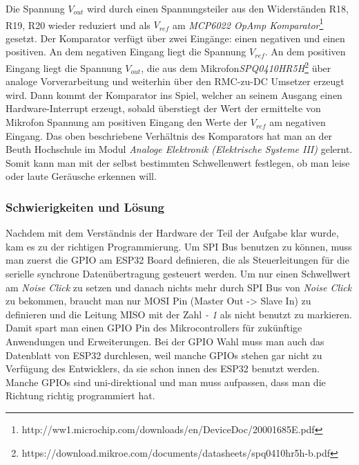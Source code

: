 Die Spannung $V_{out}$ wird durch einen Spannungsteiler aus den Widerständen R18, R19, R20 wieder reduziert und als $V_{ref}$ am \textit{MCP6022 OpAmp Komparator}\footnote{http://ww1.microchip.com/downloads/en/DeviceDoc/20001685E.pdf} gesetzt. Der Komparator verfügt über zwei Eingänge: einen negativen und einen positiven. An dem negativen Eingang liegt die Spannung $V_{ref}$. An dem positiven Eingang liegt die Spannung $V_{out}$, die aus dem Mikrofon\textit{SPQ0410HR5H}\footnote{https://download.mikroe.com/documents/datasheets/spq0410hr5h-b.pdf} über analoge Vorverarbeitung und weiterhin über den RMC-zu-DC Umsetzer erzeugt wird. 
Dann kommt der Komparator ins Spiel, welcher an seinem Ausgang einen Hardware-Interrupt erzeugt, sobald überstiegt der Wert der ermittelte von Mikrofon Spannung am positiven Eingang den Werte der $V_{ref}$ am negativen Eingang. Das oben beschriebene Verhältnis des Komparators hat man an der Beuth Hochschule im Modul \textit{Analoge Elektronik (Elektrische Systeme III)} gelernt. Somit kann man mit der selbst bestimmten Schwellenwert festlegen, ob man leise oder laute Geräusche erkennen will.  

\subsubsection{Schwierigkeiten und Lösung}
Nachdem mit dem Verständnis der  Hardware der Teil der Aufgabe klar wurde, kam es zu der richtigen Programmierung. Um SPI Bus benutzen zu können, muss man zuerst die GPIO am ESP32 Board definieren, die als Steuerleitungen für die serielle synchrone Datenübertragung gesteuert werden. Um nur einen Schwellwert am \textit{Noise Click} zu setzen und danach nichts mehr durch SPI Bus von \textit{Noise Click} zu bekommen, braucht man nur MOSI Pin (Master Out -> Slave In) zu definieren und die Leitung MISO mit der Zahl \textit{- 1} als nicht benutzt zu markieren. Damit spart man einen GPIO Pin des Mikrocontrollers für zukünftige Anwendungen und Erweiterungen. Bei der GPIO Wahl muss man auch das Datenblatt von ESP32 durchlesen, weil manche GPIOs stehen gar nicht zu Verfügung des Entwicklers, da sie schon innen des ESP32 benutzt werden. Manche GPIOs sind uni-direktional und man muss aufpassen, dass man die Richtung richtig programmiert hat. 

